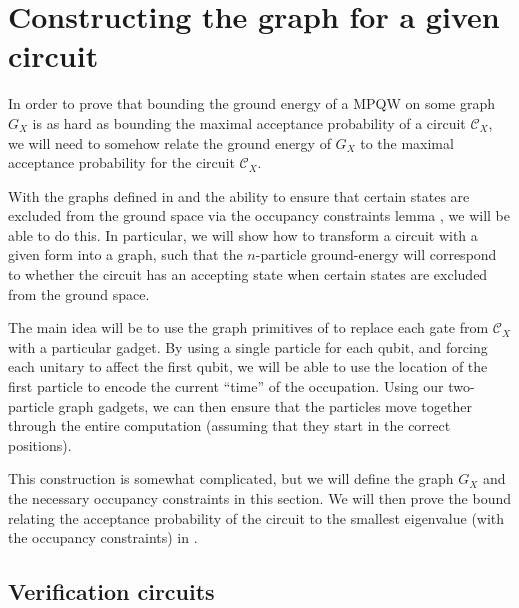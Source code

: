 \documentclass[../thesis-main/thesis-main]{subfiles}
\begin{document}
\section{Constructing the graph for a given circuit}\label{sec:graph_construction}

In order to prove that bounding the ground energy of a MPQW on some graph $G_X$ is as hard as bounding the maximal acceptance probability of a circuit $\mathcal{C}_X$, we will need to somehow relate the ground energy of $G_X$ to the maximal acceptance probability for the circuit $\mathcal{C}_X$.  

With the graphs defined in  and the ability to ensure that certain states are excluded from the ground space via the occupancy constraints lemma , we will be able to do this.   In particular, we will show how to transform a circuit with a given form into a graph, such that the $n$-particle ground-energy will correspond to whether the circuit has an accepting state when certain states are excluded from the ground space.  

The main idea will be to use the graph primitives of  to replace each gate from $\mathcal{C}_X$ with a particular gadget. By using a single particle for each qubit, and forcing each unitary to affect the first qubit, we will be able to use the location of the first particle to encode the current ``time'' of the occupation.  Using our two-particle graph gadgets, we can then ensure that the particles move together through the entire computation (assuming that they start in the correct positions).  

This construction is somewhat complicated, but we will define the graph $G_X$ and the necessary occupancy constraints in this section.  We will then prove the bound relating the acceptance probability of the circuit to the smallest eigenvalue (with the occupancy constraints) in .

\subsection{Verification circuits} \label{sec:verification_circuit}
\end{document}
